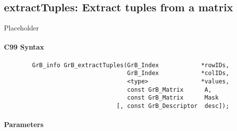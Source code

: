 \subsection{{\sf extractTuples}: Extract tuples from a matrix}
\label{Sec:extractTuples}

Placeholder


\paragraph{C99 Syntax}

\begin{verbatim}
        GrB_info GrB_extractTuples(GrB_Index            *rowIDs,
                                   GrB_Index            *colIDs,
                                   <type>               *values, 
                                   const GrB_Matrix      A,
                                   const GrB_Matrix      Mask
                                [, const GrB_Descriptor  desc]);
\end{verbatim}

\paragraph{Parameters}

